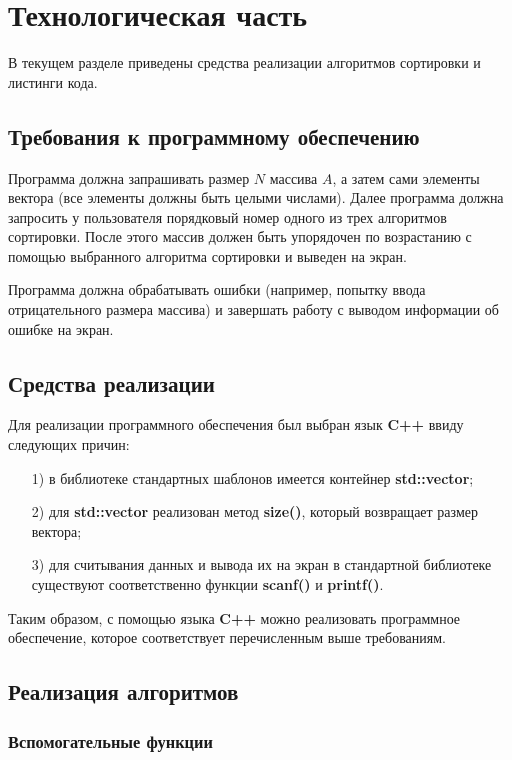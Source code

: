 \chapter{Технологическая часть}

В текущем разделе приведены средства реализации алгоритмов сортировки и листинги кода.

\section{Требования к программному обеспечению}

Программа должна запрашивать размер $N$ массива $A$, а затем сами элементы вектора (все элементы должны быть целыми числами). 
Далее программа должна запросить у пользователя порядковый номер одного из трех алгоритмов сортировки. 
После этого массив должен быть упорядочен по возрастанию с помощью выбранного алгоритма сортировки и выведен на экран.

Программа должна обрабатывать ошибки (например, попытку ввода отрицательного размера массива) и завершать работу с выводом информации об ошибке на экран.
 
\section{Средства реализации}

Для реализации программного обеспечения был выбран язык \textbf{C++} ввиду следующих причин:

\begin{enumerate}
\item[1)]
в библиотеке стандартных шаблонов имеется контейнер \textbf{std::vector};
\item[2)]
для \textbf{std::vector} реализован метод \textbf{size()}, который возвращает размер вектора;
\item[3)]
для считывания данных и вывода их на экран в стандартной библиотеке существуют соответственно функции \textbf{scanf()} и \textbf{printf()}.
\end{enumerate}

Таким образом, с помощью языка \textbf{C++} можно реализовать программное обеспечение, которое соответствует перечисленным выше требованиям.

\section{Реализация алгоритмов}

\subsection{Вспомогательные функции}

